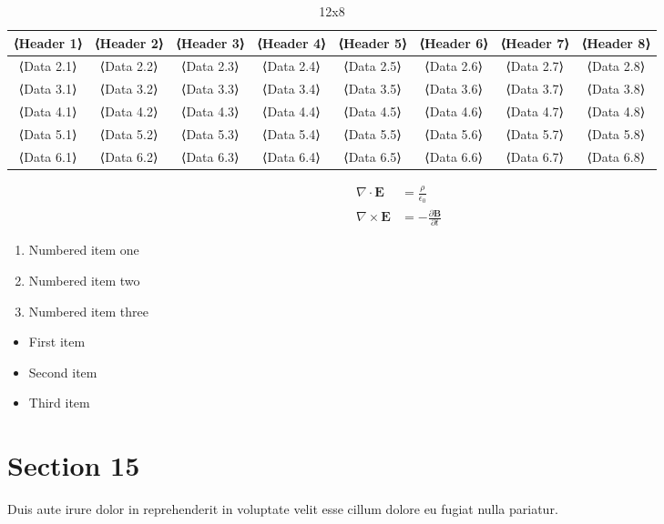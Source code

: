 \documentclass{article}
\begin{document}
\begin{table}[htbp]
    \centering
    \begin{tabular}{|c|c|c|c|c|c|c|c|}
        \hline
        \textbf{⟨Header 1⟩} & \textbf{⟨Header 2⟩} & \textbf{⟨Header 3⟩} & \textbf{⟨Header 4⟩} & \textbf{⟨Header 5⟩} & \textbf{⟨Header 6⟩} & \textbf{⟨Header 7⟩} & \textbf{⟨Header 8⟩} \\
        \hline
        ⟨Data 2.1⟩ & ⟨Data 2.2⟩ & ⟨Data 2.3⟩ & ⟨Data 2.4⟩ & ⟨Data 2.5⟩ & ⟨Data 2.6⟩ & ⟨Data 2.7⟩ & ⟨Data 2.8⟩ \\
        ⟨Data 3.1⟩ & ⟨Data 3.2⟩ & ⟨Data 3.3⟩ & ⟨Data 3.4⟩ & ⟨Data 3.5⟩ & ⟨Data 3.6⟩ & ⟨Data 3.7⟩ & ⟨Data 3.8⟩ \\
        ⟨Data 4.1⟩ & ⟨Data 4.2⟩ & ⟨Data 4.3⟩ & ⟨Data 4.4⟩ & ⟨Data 4.5⟩ & ⟨Data 4.6⟩ & ⟨Data 4.7⟩ & ⟨Data 4.8⟩ \\
        ⟨Data 5.1⟩ & ⟨Data 5.2⟩ & ⟨Data 5.3⟩ & ⟨Data 5.4⟩ & ⟨Data 5.5⟩ & ⟨Data 5.6⟩ & ⟨Data 5.7⟩ & ⟨Data 5.8⟩ \\
        ⟨Data 6.1⟩ & ⟨Data 6.2⟩ & ⟨Data 6.3⟩ & ⟨Data 6.4⟩ & ⟨Data 6.5⟩ & ⟨Data 6.6⟩ & ⟨Data 6.7⟩ & ⟨Data 6.8⟩ \\
        \hline
    \end{tabular}
    \caption{12x8}
    \label{tab:it is}
\end{table}

\begin{align}
    \nabla \cdot \mathbf{E} &= \frac{\rho}{\epsilon_0} \\
    \nabla \times \mathbf{E} &= -\frac{\partial \mathbf{B}}{\partial t}
\end{align}

\begin{enumerate}
\item Numbered item one
\item Numbered item two
\item Numbered item three
\end{enumerate}

\begin{itemize}
\item First item
\item Second item
\item Third item
\end{itemize}

\section{Section 15}

Duis aute irure dolor in reprehenderit in voluptate velit esse cillum dolore eu fugiat nulla pariatur.
\end{document}
